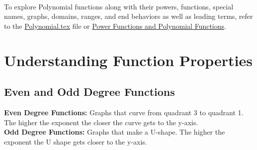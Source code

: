 \documentclass{article}
\begin{document}
 \\
To explore Polynomial functions along with their powers, functions, special names, graphs, domains, ranges, and end behaviors as well as leading terms, refer to the \href{run:./Unit\%201\%20-\%20Polynomial\%20Functions/Polynomial.tex}{Polynomial.tex} file or \href{https://math.libretexts.org/Bookshelves/Precalculus/Precalculus_1e_(OpenStax)/03%3A_Polynomial_and_Rational_Functions/3.03%3A_Power_Functions_and_Polynomial_Functions}{Power Functions and Polynomial Functions}.

\section*{Understanding Function Properties}

\subsection*{Even and Odd Degree Functions}

\textbf{Even Degree Functions:} Graphs that curve from quadrant 3 to quadrant 1. The higher the exponent the closer the curve gets to the y-axis.\\
\textbf{Odd Degree Functions:} Graphs that make a U-shape. The higher the exponent the U shape gets closer to the y-axis. 
\end{document}
